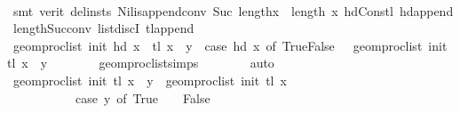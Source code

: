 \begin{isabellebody}
\ \ \ \ \ \ \isamarkupfalse%
\ {\isacharparenleft}{\kern0pt}smt\ {\isacharparenleft}{\kern0pt}verit{\isacharcomma}{\kern0pt}\ del{\isacharunderscore}{\kern0pt}insts{\isacharparenright}{\kern0pt}\ Nil{\isacharunderscore}{\kern0pt}is{\isacharunderscore}{\kern0pt}append{\isacharunderscore}{\kern0pt}conv\ {\isacartoucheopen}Suc\ lengthx\ {\isacharequal}{\kern0pt}\ length\ x{\isacartoucheclose}\ hd{\isacharunderscore}{\kern0pt}Cons{\isacharunderscore}{\kern0pt}tl\ hd{\isacharunderscore}{\kern0pt}append{}\ length{\isacharunderscore}{\kern0pt}Suc{\isacharunderscore}{\kern0pt}conv\ list{\isachardot}{\kern0pt}discI\ tl{\isacharunderscore}{\kern0pt}append{}{\isacharparenright}{\kern0pt}\isanewline
\ \ \ \ \isamarkupfalse%
\ \isamarkupfalse%
\ {\isachardoublequoteopen}geom{\isacharunderscore}{\kern0pt}proc{\isacharunderscore}{\kern0pt}list\ init\ {\isacharparenleft}{\kern0pt}hd\ x\ {\isacharhash}{\kern0pt}\ {\isacharparenleft}{\kern0pt}tl\ x\ {\isacharat}{\kern0pt}\ {\isacharbrackleft}{\kern0pt}y{\isacharbrackright}{\kern0pt}{\isacharparenright}{\kern0pt}{\isacharparenright}{\kern0pt}\ {\isacharequal}{\kern0pt}\ {\isacharparenleft}{\kern0pt}case\ hd\ x\ of\ True{\isasymRightarrow}{}{\isacharbar}{\kern0pt}False{\isasymRightarrow}\ {\isacharminus}{\kern0pt}{}{\isacharparenright}{\kern0pt}\ {\isacharplus}{\kern0pt}\ geom{\isacharunderscore}{\kern0pt}proc{\isacharunderscore}{\kern0pt}list\ init\ {\isacharparenleft}{\kern0pt}tl\ x\ {\isacharat}{\kern0pt}\ {\isacharbrackleft}{\kern0pt}y{\isacharbrackright}{\kern0pt}{\isacharparenright}{\kern0pt}{\isachardoublequoteclose}\isanewline
\ \ \ \ \ \ \isamarkupfalse%
\ geom{\isacharunderscore}{\kern0pt}proc{\isacharunderscore}{\kern0pt}list{\isachardot}{\kern0pt}simps\isanewline
\ \ \ \ \ \ \isamarkupfalse%
\ auto\isanewline
\ \ \ \ \isamarkupfalse%
\ \isamarkupfalse%
\ {\isachardoublequoteopen}geom{\isacharunderscore}{\kern0pt}proc{\isacharunderscore}{\kern0pt}list\ init\ {\isacharparenleft}{\kern0pt}tl\ x\ {\isacharat}{\kern0pt}\ {\isacharbrackleft}{\kern0pt}y{\isacharbrackright}{\kern0pt}{\isacharparenright}{\kern0pt}\ {\isacharequal}{\kern0pt}\ geom{\isacharunderscore}{\kern0pt}proc{\isacharunderscore}{\kern0pt}list\ init\ {\isacharparenleft}{\kern0pt}tl\ x{\isacharparenright}{\kern0pt}\ {\isacharplus}{\kern0pt}\isanewline
\ \ \ \ \ \ \ \ \ \ \ {\isacharparenleft}{\kern0pt}case\ y\ of\ True\ {\isasymRightarrow}\ {}\ {\isacharbar}{\kern0pt}\ False\ {\isasymRightarrow}\ {\isacharminus}{\kern0pt}\ {}{\isacharparenright}{\kern0pt}{\isachardoublequoteclose}\isanewline

\end{isabellebody}

